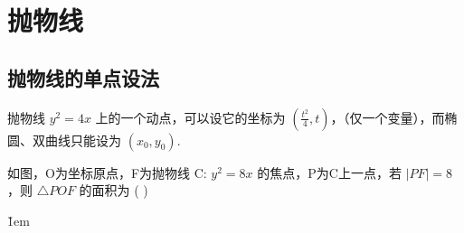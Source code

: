 \section{抛物线}

\subsection{抛物线的单点设法}

\begin{theorem}
    抛物线 $y^2=4x$ 上的一个动点，可以设它的坐标为 $(\frac{t^2}{4},t)$，（仅一个变量），而椭圆、双曲线只能设为 $(x_0,y_0)$.
\end{theorem}

\begin{example}
    如图，O为坐标原点，F为抛物线 C: $y^2=8x$ 的焦点，P为C上一点，若 $|PF|=8$，则 $\triangle POF$ 的面积为 ( \quad )
\end{example}

\v{1em}

